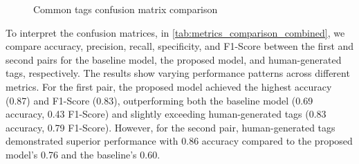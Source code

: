 \begin{figure}[h]
    \centering
    \hfill

    \caption{Common tags confusion matrix comparison}
    \label{fig:second_pair_common_tags_confusion_matrix}
\end{figure}

To interpret the confusion matrices, in \cref{tab:metrics_comparison_combined}, we compare accuracy, precision, recall, specificity, and F1-Score between the first and second pairs for the baseline model, the proposed model, and human-generated tags, respectively. The results show varying performance patterns across different metrics. For the first pair, the proposed model achieved the highest accuracy (0.87) and F1-Score (0.83), outperforming both the baseline model (0.69 accuracy, 0.43 F1-Score) and slightly exceeding human-generated tags (0.83 accuracy, 0.79 F1-Score). However, for the second pair, human-generated tags demonstrated superior performance with 0.86 accuracy compared to the proposed model's 0.76 and the baseline's 0.60.

